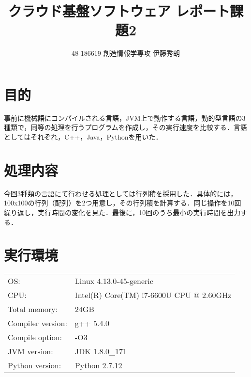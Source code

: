 \documentclass[onecolumn]{preport}
\title{クラウド基盤ソフトウェア レポート課題2}
\author{48-186619 創造情報学専攻 伊藤秀朗}
\begin{document}
\pagestyle{empty}
\maketitle
\thispagestyle{empty}
\sloppy

\section{目的}
事前に機械語にコンパイルされる言語，JVM上で動作する言語，動的型言語の3種類で，同等の処理を行うプログラムを作成し，その実行速度を比較する．言語としてはそれぞれ，C++，Java，Pythonを用いた．

\section{処理内容}
今回3種類の言語にて行わせる処理としては行列積を採用した．具体的には，100x100の行列（配列）を2つ用意し，その行列積を計算する．同じ操作を10回繰り返し，実行時間の変化を見た．最後に，10回のうち最小の実行時間を出力する．

\section{実行環境}
\begin{table}[tbh]
  \begin{tabular}{ll}
    OS: & Linux 4.13.0-45-generic\\
    CPU: & Intel(R) Core(TM) i7-6600U CPU @ 2.60GHz\\
    Total memory: & 24GB\\
    Compiler version: & g++ 5.4.0\\
    Compile option: & -O3\\
    JVM version: & JDK 1.8.0\_171\\
    Python version: & Python 2.7.12\\
  \end{tabular}
\end{table}





\end{document}
